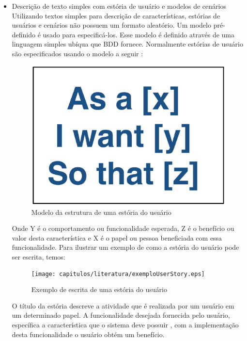 \begin{itemize}

	\item Descrição de texto simples com estória de usuário e modelos de cenários
Utilizando textos simples para descrição de características,  estórias de usuários e cenários não possuem um formato aleatório. Um modelo pré-definido é usado para especificá-los. Esse modelo é definido através de uma linguagem simples ubíqua que BDD fornece. Normalmente estórias de usuário são especificados usando o modelo a seguir \cite{bddIntroducing}:

\begin{figure}[H]
	\centering
	\captionsetup{justification=centering,margin=2cm}
	\includegraphics[scale=0.35]{capitulos/literatura/userStory.eps}
	\caption{Modelo da estrutura de uma estória do usuário}
	\label{fig:iceCreamConAntiPattern}
\end{figure}

Onde Y é o comportamento ou funcionalidade esperada, Z é o benefício ou valor desta característica e X é o papel ou pessoa beneficiada com essa funcionalidade. Para ilustrar um exemplo de como a estória do usuário pode ser escrita, temos:

\begin{figure}[H]
	\centering
	\captionsetup{justification=centering,margin=2cm}
	\texttt{[image: capitulos/literatura/exemploUserStory.eps]}
	\caption{Exemplo de escrita de uma estória do usuário}
	\label{fig:iceCreamConAntiPattern}
\end{figure}
	
O título da estória descreve a atividade que é realizada por um usuário em um determinado papel. A funcionalidade desejada fornecida pelo usuário, específica a característica que o sistema deve possuir , com a implementação desta funcionalidade o usuário obtém um benefício.


\end{itemize}
